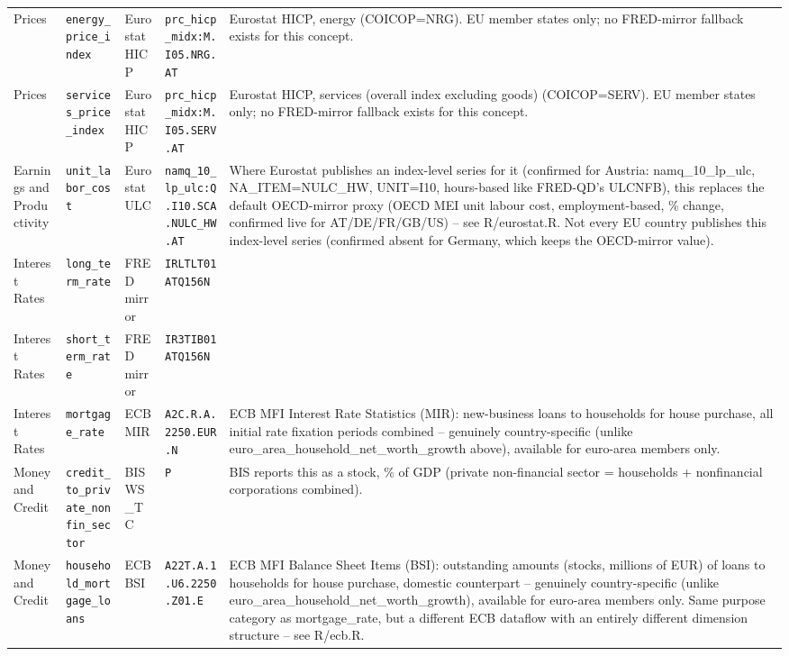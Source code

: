 \documentclass[11pt]{article}
\begin{document}
\begin{landscape}
\begin{longtable}{L{3cm} L{4cm} L{2.6cm} L{3.2cm} L{7.5cm}}
Prices & \texttt{energy\_\allowbreak{}price\_\allowbreak{}index} & Eurostat HICP & \texttt{prc\_\allowbreak{}hicp\_\allowbreak{}midx:\allowbreak{}M.\allowbreak{}I05.\allowbreak{}NRG.\allowbreak{}AT} & Eurostat HICP, energy (COICOP=NRG). EU member states only; no FRED-mirror fallback exists for this concept. \\
Prices & \texttt{services\_\allowbreak{}price\_\allowbreak{}index} & Eurostat HICP & \texttt{prc\_\allowbreak{}hicp\_\allowbreak{}midx:\allowbreak{}M.\allowbreak{}I05.\allowbreak{}SERV.\allowbreak{}AT} & Eurostat HICP, services (overall index excluding goods) (COICOP=SERV). EU member states only; no FRED-mirror fallback exists for this concept. \\
Earnings and Productivity & \texttt{unit\_\allowbreak{}labor\_\allowbreak{}cost} & Eurostat ULC & \texttt{namq\_\allowbreak{}10\_\allowbreak{}lp\_\allowbreak{}ulc:\allowbreak{}Q.\allowbreak{}I10.\allowbreak{}SCA.\allowbreak{}NULC\_\allowbreak{}HW.\allowbreak{}AT} & Where Eurostat publishes an index-level series for it (confirmed for Austria: namq\_10\_lp\_ulc, NA\_ITEM=NULC\_HW, UNIT=I10, hours-based like FRED-QD's ULCNFB), this replaces the default OECD-mirror proxy (OECD MEI unit labour cost, employment-based, \% change, confirmed live for AT/DE/FR/GB/US) -- see R/eurostat.R. Not every EU country publishes this index-level series (confirmed absent for Germany, which keeps the OECD-mirror value). \\
Interest Rates & \texttt{long\_\allowbreak{}term\_\allowbreak{}rate} & FRED mirror & \texttt{IRLTLT01ATQ156N} &  \\
Interest Rates & \texttt{short\_\allowbreak{}term\_\allowbreak{}rate} & FRED mirror & \texttt{IR3TIB01ATQ156N} &  \\
Interest Rates & \texttt{mortgage\_\allowbreak{}rate} & ECB MIR & \texttt{A2C.\allowbreak{}R.\allowbreak{}A.\allowbreak{}2250.\allowbreak{}EUR.\allowbreak{}N} & ECB MFI Interest Rate Statistics (MIR): new-business loans to households for house purchase, all initial rate fixation periods combined -- genuinely country-specific (unlike euro\_area\_household\_net\_worth\_growth above), available for euro-area members only. \\
Money and Credit & \texttt{credit\_\allowbreak{}to\_\allowbreak{}private\_\allowbreak{}nonfin\_\allowbreak{}sector} & BIS WS\_TC & \texttt{P} & BIS reports this as a stock, \% of GDP (private non-financial sector = households + nonfinancial corporations combined). \\
Money and Credit & \texttt{household\_\allowbreak{}mortgage\_\allowbreak{}loans} & ECB BSI & \texttt{A22T.\allowbreak{}A.\allowbreak{}1.\allowbreak{}U6.\allowbreak{}2250.\allowbreak{}Z01.\allowbreak{}E} & ECB MFI Balance Sheet Items (BSI): outstanding amounts (stocks, millions of EUR) of loans to households for house purchase, domestic counterpart -- genuinely country-specific (unlike euro\_area\_household\_net\_worth\_growth), available for euro-area members only. Same purpose category as mortgage\_rate, but a different ECB dataflow with an entirely different dimension structure -- see R/ecb.R. \\

\end{longtable}
\end{landscape}
\end{document}
